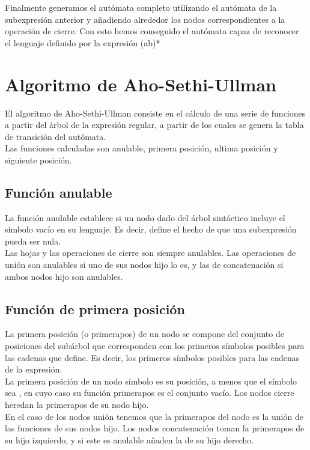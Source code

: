
Finalmente generamos el autómata completo utilizando el autómata de la subexpresión anterior y añadiendo alrededor los nodos correspondientes a la operación de cierre.
Con esto hemos conseguido el autómata capaz de reconocer el lenguaje definido por la expresión (a\textbar b)*


\section{Algoritmo de Aho-Sethi-Ullman}
El algoritmo de Aho-Sethi-Ullman \cite{dragon} consiste en el cálculo de una serie de funciones a partir del árbol de la expresión regular, a partir de los cuales se genera la tabla de transición del autómata.
\\
Las funciones calculadas son anulable, primera posición, ultima posición y siguiente posición.

\subsection{Función anulable}
La función anulable establece si un nodo dado del árbol sintáctico incluye el símbolo vacío \epsilon en su lenguaje.
Es decir, define el hecho de que una subexpresión pueda ser nula.
\\
Las hojas \epsilon y las operaciones de cierre son siempre anulables.
Las operaciones de unión son anulables si uno de sus nodos hijo lo es, y las de concatenación si ambos nodos hijo son anulables.

\subsection{Función de primera posición}
La primera posición (o primerapos) de un nodo se compone del conjunto de posiciones del subárbol que corresponden con los primeros símbolos posibles para las cadenas que define.
Es decir, los primeros símbolos posibles para las cadenas de la expresión.
\\
La primera posición de un nodo símbolo es su posición, a menos que el símbolo sea \epsilon, en cuyo caso su función primerapos es el conjunto vacío.
Los nodos cierre heredan la primerapos de su nodo hijo.
\\
En el caso de los nodos unión tenemos que la primerapos del nodo es la unión de las funciones de sus nodos hijo.
Los nodos concatenación toman la primerapos de su hijo izquierdo, y si este es anulable añaden la de su hijo derecho.

